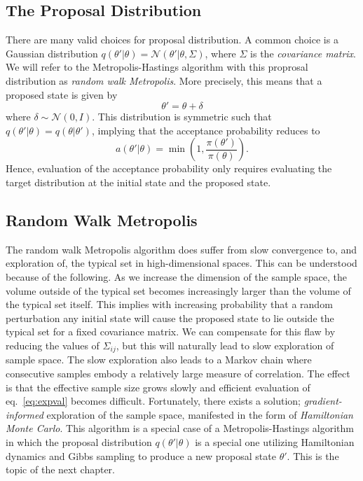 \subsection{The Proposal Distribution}
There are many valid choices for proposal distribution. A common choice is a Gaussian distribution $q(\theta'|\theta) = \mathcal{N}(\theta'|\theta, \Sigma)$,
where $\Sigma$ is the \textit{covariance matrix}.
We will refer to the Metropolis-Hastings algorithm with this proprosal distribution as \textit{random walk Metropolis}.
More precisely, this means that a proposed state is given by
\begin{equation}
  \theta' = \theta + \delta
\end{equation}
where $\delta \sim \mathcal{N}(0, I)$. This distribution is symmetric such that $q(\theta'|\theta) = q(\theta|\theta')$, implying that the acceptance probability
reduces to
\begin{equation}\label{eq:symmetric_acceptance_prob}
    a(\theta'|\theta) = \min \left(1, \frac{\pi(\theta')}{\pi(\theta)}\right).
\end{equation}
Hence, evaluation of the acceptance probability only requires evaluating the target distribution at the initial state and the proposed state.

\subsection{Random Walk Metropolis}
The random walk Metropolis algorithm does suffer from slow convergence to, and exploration of, the typical set in high-dimensional spaces.
This can be understood because of the following. 
As we increase the dimension of the sample space, the volume outside of the typical set becomes increasingly larger than the volume of the typical set itself.
This implies with increasing probability that a random perturbation any initial state will cause the proposed state
to lie outside the typical set for a fixed covariance matrix.
We can compensate
for this flaw by reducing the values of $\Sigma_{ij}$, but this will naturally lead to slow exploration of
sample space. The slow exploration also leads to a Markov chain where consecutive
samples embody
a relatively large measure of correlation. The effect is that the effective sample size grows slowly
and efficient evaluation of eq.~\eqref{eq:expval} becomes difficult.
Fortunately, there exists a solution; \textit{gradient-informed} exploration of the sample space, manifested in
the form of \textit{Hamiltonian Monte Carlo}. This algorithm is a special case of a Metropolis-Hastings algorithm
in which the proposal distribution $q(\theta'|\theta)$ is a special one utilizing Hamiltonian dynamics and Gibbs sampling
to produce a new proposal state $\theta'$. This is the topic of the next chapter.

